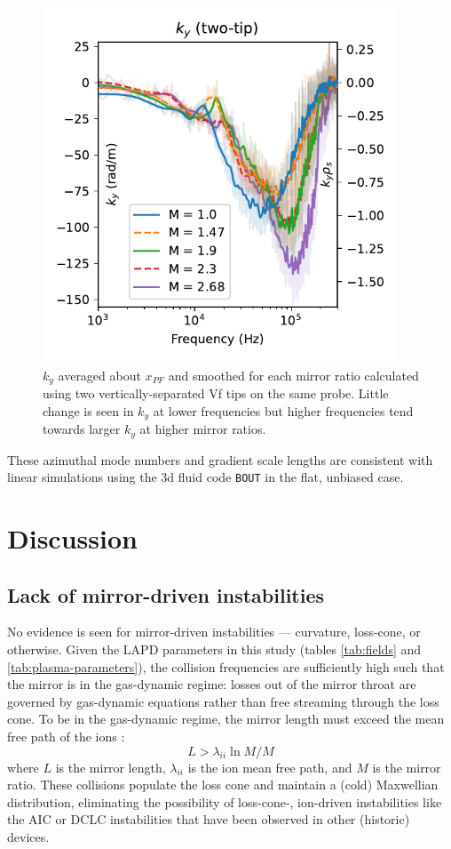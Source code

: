 \begin{figure}
    \centering
    \includegraphics[width=300pt]{figures/fig18.pdf}
    \caption[$k_y$ averaged about $x_{PF}$]{$k_y$ averaged about $x_{PF}$ and smoothed for each mirror ratio calculated using two vertically-separated Vf tips on the same probe. Little change is seen in $k_y$ at lower frequencies but higher frequencies tend towards larger $k_y$ at higher mirror ratios.}
    \label{fig:kperp}
\end{figure}
These azimuthal mode numbers and gradient scale lengths are consistent with linear simulations using the 3d fluid code \texttt{BOUT} \cite{Popovich_2010} in the flat, unbiased case.

\section{\label{sec:discussion}Discussion}
\subsection{Lack of mirror-driven instabilities}
No evidence is seen for mirror-driven instabilities — curvature, loss-cone, or otherwise. Given the LAPD parameters in this study (tables \ref{tab:fields} and \ref{tab:plasma-parameters}), the collision frequencies are sufficiently high such that the mirror is in the gas-dynamic regime: losses out of the mirror throat are governed by gas-dynamic equations rather than free streaming through the loss cone. To be in the gas-dynamic regime, the mirror length must exceed the mean free path of the ions \cite{Ivanov_2013}:
\begin{equation}
    L > \lambda_{ii} \ln{M} / M
\end{equation}
where $L$ is the mirror length, $\lambda_{ii}$ is the ion mean free path, and $M$ is the mirror ratio.
These collisions populate the loss cone and maintain a (cold) Maxwellian distribution, eliminating the possibility of loss-cone-, ion-driven instabilities like the AIC \cite{Casper_1982} or DCLC \cite{Simonen_1976,Kanaev_1979} instabilities that have been observed in other (historic) devices. 

